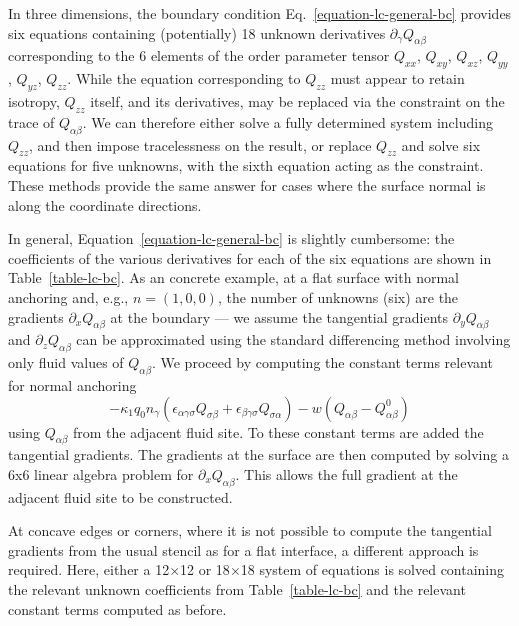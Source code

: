 In three dimensions, the boundary condition Eq.~\ref{equation-lc-general-bc}
provides six equations containing (potentially) 18 unknown derivatives
$\partial_\gamma Q_{\alpha\beta}$
corresponding to the 6 elements of the order parameter
tensor $Q_{xx}$, $Q_{xy}$, $Q_{xz}$, $Q_{yy}$, $Q_{yz}$, $Q_{zz}$.
While the equation corresponding to $Q_{zz}$ must appear to
retain isotropy, $Q_{zz}$ itself, and its derivatives, may be
replaced via the
constraint on the trace of $Q_{\alpha\beta}$. We can therefore either
solve a fully determined system including $Q_{zz}$, and then impose
tracelessness on the result, or replace $Q_{zz}$ and solve six
equations for five unknowns, with the sixth equation acting as the
constraint. These methods provide the same answer for cases where
the surface normal is along the coordinate directions.

In general, Equation~\ref{equation-lc-general-bc} is slightly
cumbersome: the coefficients of the various derivatives for each
of the six equations are shown in Table~\ref{table-lc-bc}. As an
concrete example,
at a flat surface with normal anchoring and, e.g., $n = (1, 0, 0)$,
the number of unknowns (six) are the gradients $\partial_x Q_{\alpha\beta}$
at the boundary --- we assume the tangential gradients
$\partial_y Q_{\alpha\beta}$
and $\partial_z Q_{\alpha\beta}$ can be approximated
using the standard differencing method involving only fluid values of
$Q_{\alpha\beta}$. We proceed by
computing the constant terms relevant for normal anchoring
$$
- \kappa_1 q_0 n_\gamma (\epsilon_{\alpha\gamma\sigma} Q_{\sigma\beta}
+ \epsilon_{\beta\gamma\sigma}Q_{\sigma\alpha})
- w(Q_{\alpha\beta} - Q_{\alpha\beta}^0)
$$
using $Q_{\alpha\beta}$ from the adjacent fluid site. To these
constant terms are added the tangential gradients.
The gradients at the surface are then computed by solving a 6x6
linear algebra problem for $\partial_x Q_{\alpha\beta}$. This
allows the full gradient at the adjacent fluid site to be constructed.

At concave edges or corners, where it is not possible to compute the
tangential gradients from the usual stencil as for a flat interface,
a different approach is required. Here, either a 12$\times$12 or
18$\times$18 system of equations is solved containing the relevant
unknown coefficients from Table~\ref{table-lc-bc} and the relevant
constant terms computed as before.





\vfill
\pagebreak

